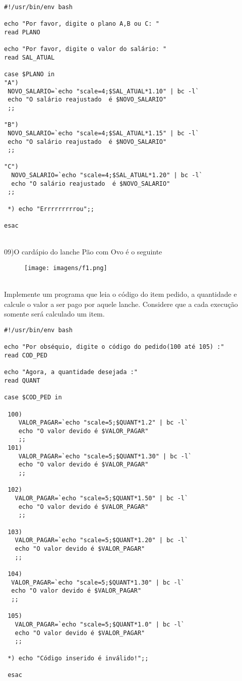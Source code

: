 \documentclass[a4paper,13pt]{article}
\begin{document}
\begin{verbatim}
#!/usr/bin/env bash

echo "Por favor, digite o plano A,B ou C: "
read PLANO

echo "Por favor, digite o valor do salário: "
read SAL_ATUAL

case $PLANO in
"A")
 NOVO_SALARIO=`echo "scale=4;$SAL_ATUAL*1.10" | bc -l`
 echo "O salário reajustado  é $NOVO_SALARIO"
 ;;

"B")
 NOVO_SALARIO=`echo "scale=4;$SAL_ATUAL*1.15" | bc -l`
 echo "O salário reajustado  é $NOVO_SALARIO"
 ;;

"C")
  NOVO_SALARIO=`echo "scale=4;$SAL_ATUAL*1.20" | bc -l`
  echo "O salário reajustado  é $NOVO_SALARIO"
 ;;
 
 *) echo "Errrrrrrrrou";;
 
esac
\end{verbatim}
\\
09)O cardápio do lanche Pão com Ovo é o seguinte\\
\begin{figure}[htb]
 \centering
 \texttt{[image: imagens/f1.png]}
\end{figure}
\\
Implemente um programa que leia o código do item pedido, a quantidade e calcule o valor a ser pago por aquele lanche. Considere que a cada execução somente será calculado um item.\\
\begin{verbatim}
#!/usr/bin/env bash

echo "Por obséquio, digite o código do pedido(100 até 105) :"
read COD_PED

echo "Agora, a quantidade desejada :"
read QUANT

case $COD_PED in

 100)
    VALOR_PAGAR=`echo "scale=5;$QUANT*1.2" | bc -l`
    echo "O valor devido é $VALOR_PAGAR"
    ;;
 101) 
    VALOR_PAGAR=`echo "scale=5;$QUANT*1.30" | bc -l`
    echo "O valor devido é $VALOR_PAGAR"
    ;;
 
 102)
   VALOR_PAGAR=`echo "scale=5;$QUANT*1.50" | bc -l`
    echo "O valor devido é $VALOR_PAGAR"
    ;;
 
 103)
   VALOR_PAGAR=`echo "scale=5;$QUANT*1.20" | bc -l`
   echo "O valor devido é $VALOR_PAGAR"
   ;;
 
 104)
  VALOR_PAGAR=`echo "scale=5;$QUANT*1.30" | bc -l`
  echo "O valor devido é $VALOR_PAGAR"
  ;; 
 
 105)
   VALOR_PAGAR=`echo "scale=5;$QUANT*1.0" | bc -l`
   echo "O valor devido é $VALOR_PAGAR"
   ;;
  
 *) echo "Código inserido é inválido!";;
 
 esac

\end{verbatim}
\end{document}
